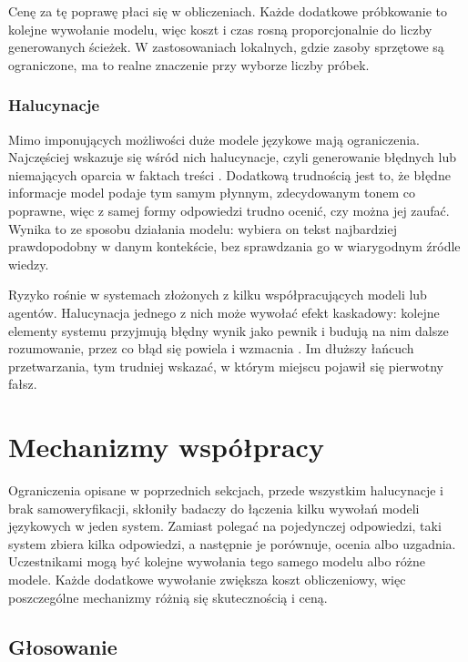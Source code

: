 Cenę za tę poprawę płaci się w obliczeniach. Każde dodatkowe próbkowanie to kolejne wywołanie modelu, więc koszt i czas rosną proporcjonalnie do liczby generowanych ścieżek. W zastosowaniach lokalnych, gdzie zasoby sprzętowe są ograniczone, ma to realne znaczenie przy wyborze liczby próbek.

\subsubsection{Halucynacje}

Mimo imponujących możliwości duże modele językowe mają ograniczenia. Najczęściej wskazuje się wśród nich halucynacje, czyli generowanie błędnych lub niemających oparcia w faktach treści \cite{ma_collaboration}. Dodatkową trudnością jest to, że błędne informacje model podaje tym samym płynnym, zdecydowanym tonem co poprawne, więc z samej formy odpowiedzi trudno ocenić, czy można jej zaufać. Wynika to ze sposobu działania modelu: wybiera on tekst najbardziej prawdopodobny w danym kontekście, bez sprawdzania go w wiarygodnym źródle wiedzy.

Ryzyko rośnie w systemach złożonych z kilku współpracujących modeli lub agentów. Halucynacja jednego z nich może wywołać efekt kaskadowy: kolejne elementy systemu przyjmują błędny wynik jako pewnik i budują na nim dalsze rozumowanie, przez co błąd się powiela i wzmacnia \cite{llm_hallucination_survey}. Im dłuższy łańcuch przetwarzania, tym trudniej wskazać, w którym miejscu pojawił się pierwotny fałsz.

\label{sec:llm}

\section{Mechanizmy współpracy}

Ograniczenia opisane w poprzednich sekcjach, przede wszystkim halucynacje i brak samoweryfikacji, skłoniły badaczy do łączenia kilku wywołań modeli językowych w jeden system. Zamiast polegać na pojedynczej odpowiedzi, taki system zbiera kilka odpowiedzi, a następnie je porównuje, ocenia albo uzgadnia. Uczestnikami mogą być kolejne wywołania tego samego modelu albo różne modele. Każde dodatkowe wywołanie zwiększa koszt obliczeniowy, więc poszczególne mechanizmy różnią się skutecznością i ceną.

\subsection{Głosowanie}

